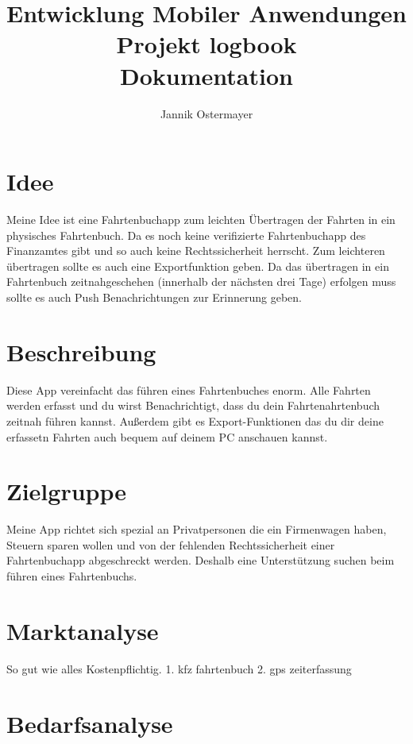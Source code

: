 \documentclass{article}
\title{Entwicklung Mobiler Anwendungen \\Projekt logbook \\ Dokumentation}
\author{Jannik Ostermayer}
\begin{document}
\begin{titlepage}
    \clearpage
    \maketitle          %
    \thispagestyle{empty}
\end{titlepage}

\tableofcontents    %
\pagebreak          %

\section{Idee}
Meine Idee ist eine Fahrtenbuchapp zum leichten Übertragen 
der Fahrten in ein physisches Fahrtenbuch.
Da es noch keine verifizierte Fahrtenbuchapp 
des Finanzamtes gibt und so auch keine Rechtssicherheit herrscht.
Zum leichteren übertragen sollte es auch eine Exportfunktion geben.
Da das übertragen in ein Fahrtenbuch zeitnahgeschehen (innerhalb der 
nächsten drei Tage) erfolgen muss sollte es auch Push Benachrichtungen
zur Erinnerung geben. 

\section{Beschreibung}
Diese App vereinfacht das führen eines Fahrtenbuches enorm. 
Alle Fahrten werden erfasst und du wirst Benachrichtigt, dass du dein 
Fahrtenahrtenbuch zeitnah führen kannst. 
Außerdem gibt es Export-Funktionen das du dir deine erfassetn Fahrten 
auch bequem auf deinem PC anschauen kannst.

\section{Zielgruppe}
Meine App richtet sich spezial an Privatpersonen die ein Firmenwagen haben,
Steuern sparen wollen und von der fehlenden Rechtssicherheit einer Fahrtenbuchapp 
abgeschreckt werden. Deshalb eine Unterstützung suchen beim führen eines Fahrtenbuchs.


\section{Marktanalyse}
So gut wie alles Kostenpflichtig.
1. kfz fahrtenbuch
2. gps zeiterfassung

\section{Bedarfsanalyse}
\end{document}
